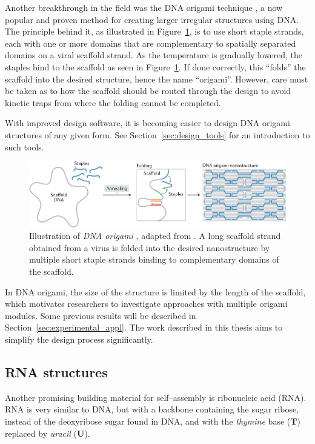 
Another breakthrough in the field was the DNA origami technique \cite{rothemund2006folding}, a now popular and proven method for creating larger irregular structures using DNA. The principle behind it, as illustrated in Figure~\ref{fig:dnaOrigami}, is to use short staple strands, each with one or more domains that are complementary to spatially separated domains on a viral scaffold strand. As the temperature is gradually lowered, the staples bind to the scaffold as seen in Figure~\ref{fig:dnaOrigami}. If done correctly, this ``folds'' the scaffold into the desired structure, hence the name ``origami''. However, care must be taken as to how the scaffold should be routed through the design to avoid kinetic traps from where the folding cannot be completed.

With improved design software, it is becoming easier to design DNA origami structures of any given form. See Section~\ref{sec:design_tools} for an introduction to such tools.

\begin{figure}
    \centering
    \includegraphics[width=\textwidth]{figures/dna_origami.png}
    \caption{Illustration of \emph{DNA origami} \cite{rothemund2006folding}, adapted from \cite{dey2021dna}. A long scaffold strand obtained from a virus is folded into the desired nanostructure by multiple short staple strands binding to complementary domains of the scaffold.
    }
    \label{fig:dnaOrigami}
\end{figure}

In DNA origami, the size of the structure is limited by the length of the scaffold, which motivates researchers to investigate approaches with multiple origami modules. Some previous results will be described in Section~\ref{sec:experimental_appl}. The work described in this thesis aims to simplify the design process significantly.

\subsection{RNA structures}
\label{sec:RNA_design}
Another promising building material for self--assembly is ribonucleic acid (RNA). RNA is very similar to DNA, but with a backbone containing the sugar ribose, instead of the deoxyribose sugar found in DNA, and with the \emph{thymine} base (\textbf{T}) replaced by \emph{uracil} (\textbf{U}).


